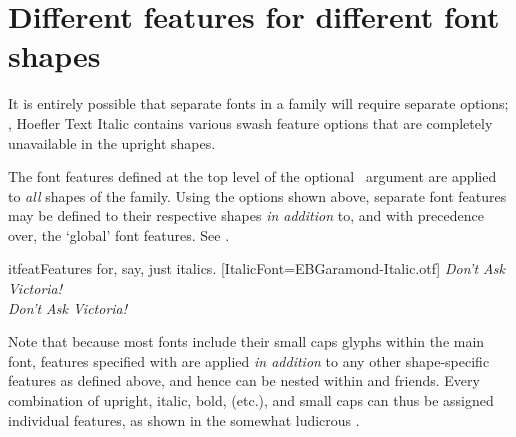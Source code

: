 \documentclass[a4paper]{l3doc}
\begin{document}
\section{Different features for different font shapes}
\label{sec:bfit-feat}


It is entirely possible that separate fonts in a family will require
separate options; \eg, Hoefler Text Italic contains various swash
feature options that are completely unavailable in the upright shapes.

The font features defined at the top level of the optional \cmd\fontspec\
argument are applied to \emph{all} shapes of the family.
Using the  options shown above,
separate font features may be defined to their respective shapes
\emph{in addition} to, and with precedence over, the `global' font features.
See \exref{itfeat}.

\begin{Xexample}{itfeat}{Features for, say, just italics.}
%
  [ItalicFont=EBGaramond-Italic.otf]
\itshape Don’t Ask Victoria! \\
Don’t Ask Victoria! \\
\end{Xexample}

Note that because most fonts include their small caps glyphs
within the main font, features specified with  are applied \emph{in addition} to
any other shape-specific features as defined above, and hence \feat{SmallCapsFeatures}
can be nested within \feat{ItalicFeatures} and friends. Every combination
of upright, italic, bold, (etc.), and small caps can thus be assigned individual
features, as shown in the somewhat ludicrous \exref{scfeat}.
\end{document}
